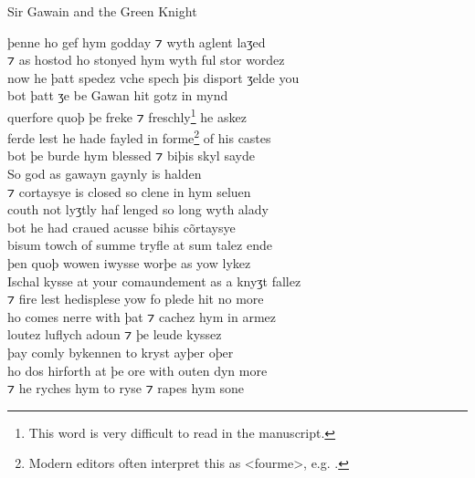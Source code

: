 \begin{texts}{Sir Gawain and the Green Knight}
\begin{textglossed}
  \internallinenumbers*{}
    þenne ho gef hym godday ⁊ wyth aglent laʒed\\
    ⁊ as hostod ho stonyed hym wyth ful stor wordez\\
    now he þatt spedez vche spech þis disport ʒelde you\\
    bot þatt ʒe be Gawan hit gotz in mynd\\
    querfore quoþ þe freke ⁊ freschly\footnote{This word is very difficult to read in the manuscript.} he askez\\
    ferde lest he hade fayled in forme\footnote{Modern editors often interpret this as <fourme>, e.g. \citet{TolkienGordon1967}.} of his castes\\
    bot þe burde hym blessed ⁊ biþis skyl sayde\\
    So god as gawayn gaynly is halden\\
    ⁊ cortaysye is closed so clene in hym seluen\\
    couth not lyʒtly haf lenged so long wyth alady\\
    bot he had craued acusse bihis cõrtaysye\\
    bisum towch of summe tryfle at sum talez ende\\
    þen quoþ wowen iwysse worþe as yow lykez\\
    Ischal kysse at your comaundement as a knyʒt fallez\\
    ⁊ fire lest hedisplese yow fo plede hit no more\\
    ho comes nerre with þat ⁊ cachez hym in armez\\
    loutez luflych adoun ⁊ þe leude kyssez\\
    þay comly bykennen to kryst ayþer oþer\\
    ho dos hirforth at þe ore with outen dyn more\\
    ⁊ he ryches hym to ryse ⁊ rapes hym sone\\

\end{textglossed}
\end{texts}
